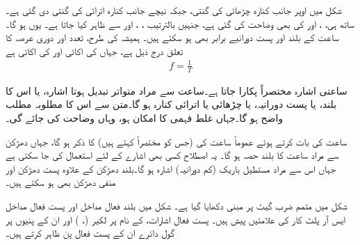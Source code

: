 شکل  میں اوپر جانب کنارہ چڑھائی کی گنتی، جبکہ نیچے جانب کنارہ اترائی کی گنتی دی گئی ہے۔ساتھ ہی، ،  اور کی بھی وضاحت کی گئی ہے، جنہیں بالترتیب ، ، اور  سے ظاہر کیا جاتا ہے۔
یوں  ہو گا۔ ساعت کے بلند اور پست دورانیے برابر بھی ہو سکتے ہیں۔ ہمیشہ کی طرح، تعدد  اور دوری عرصہ  کا تعلق درج ذیل ہے، جہاں  کی اکائی  اور  کی اکائی  ہے
\begin{align*}
f=\frac{1}{T}
\end{align*}

ساعتی اشارہ مختصراً  پکارا جاتا ہے۔ساعت سے مراد متواتر تبدیل ہوتا اشارہ، یا اس کا بلند، یا پست دورانیہ، یا چڑھائی یا اترائی کنارہ ہو گا۔متن سے اس کا مطلوبہ مطلب واضح ہو گا۔جہاں غلط فہمی کا امکان ہو، وہاں وضاحت کی جائے گی۔

ساعت کی بات کرتے ہوئے عموماً ساعت کی  (جس کو مختصراً کہتے ہیں) کا ذکر ہو گا، جہاں دھڑکن سے مراد ساعت کا بلند حصہ ہو گا۔ یہ اصطلاح کسی بھی اشارے کے لئے استعمال کی جا سکتی ہے جہاں اس سے مراد مستطیل باریک (کم دورانیہ) اشارہ ہو گا۔بلند دھڑکن کے علاوہ پست دھڑکن اور منفی دھڑکن بھی ہو سکتے ہیں۔ 

شکل  میں متمم ضرب گیٹ پر مبنی  دکھایا گیا ہے۔ شکل  میں بلند فعال مداخل اور پست فعال مداخل ایس آر پلٹ کار کی علامتیں پیش ہیں۔ پست فعال اشارات، کے نام پر لکیر (، ) اور ان کے پنیوں پر گول دائرے ان کے پست فعال پن ظاہر کرتے ہیں۔


